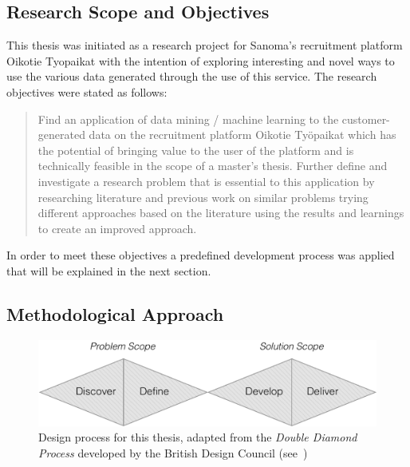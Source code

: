 \subsection{Research Scope and Objectives}
\label{sub:Research Scope and Objectives}

This thesis was initiated as a research project for Sanoma's recruitment platform \gls{Oikotie Tyopaikat} with the intention of exploring interesting and novel ways to use the various data generated through the use of this service. The research objectives were stated as follows:

\blockquote{Find an application of data mining / machine learning to the customer-generated data on the recruitment platform Oikotie Työpaikat which has the potential of bringing value to the user of the platform and is technically feasible in the scope of a master’s thesis. Further define and investigate a research problem that is essential to this application by researching literature and previous work on similar problems trying different approaches based on the literature using the results and learnings to create an improved approach.}

In order to meet these objectives a predefined development process was applied that will be explained in the next section.

\subsection{Methodological Approach}
\label{sub:Methodological Approach}

\begin{figure}[h]
    \centering
    \includegraphics[width=\textwidth]{img/double-diamond.pdf}
    \caption{Design process for this thesis, adapted from the \emph{Double Diamond Process} developed by the British Design Council (see~\cite{Council:2007aa})}
\label{fig:double-diamond}
\end{figure}

